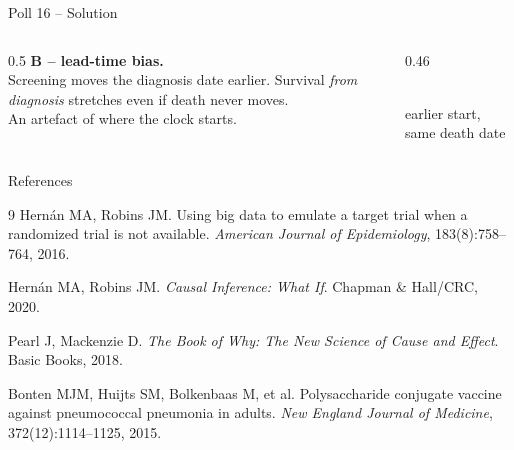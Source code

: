 \documentclass[aspectratio=169]{beamer}
\begin{document}
\begin{frame}{Poll 16 \;--\; Solution}
  \small
  \begin{columns}[T]
    \begin{column}{0.5\textwidth}
      \textcolor{good}{\textbf{B -- lead-time bias.}}\\[0.4em]
      Screening moves the diagnosis date earlier. Survival \emph{from
      diagnosis} stretches even if death never moves.\\[0.3em]
      An artefact of where the clock starts.
    \end{column}
    \begin{column}{0.46\textwidth}
      \centering
      \\[0.5em]
      {\scriptsize earlier start, same death date}
    \end{column}
  \end{columns}
\end{frame}

\begin{frame}[allowframebreaks]{References}
  \tiny
  
  \begin{thebibliography}{9}
    Hern{\'a}n MA, Robins JM.
    \newblock Using big data to emulate a target trial when a randomized trial is not available.
    \newblock \textit{American Journal of Epidemiology}, 183(8):758--764, 2016.

    Hern{\'a}n MA, Robins JM.
    \newblock \textit{Causal Inference: What If}.
    \newblock Chapman \& Hall/CRC, 2020.

    Pearl J, Mackenzie D.
    \newblock \textit{The Book of Why: The New Science of Cause and Effect}.
    \newblock Basic Books, 2018.

    Bonten MJM, Huijts SM, Bolkenbaas M, et al.
    \newblock Polysaccharide conjugate vaccine against pneumococcal pneumonia in adults.
    \newblock \textit{New England Journal of Medicine}, 372(12):1114--1125, 2015.
  \end{thebibliography}
\end{frame}
\end{document}
